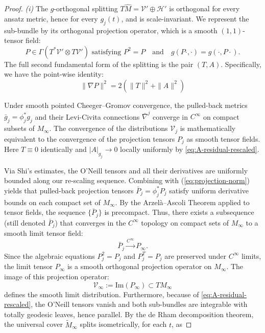 \documentclass[11pt]{amsart}
\theoremstyle{plain}
\numberwithin{equation}{section}
\theoremstyle{definition}
\theoremstyle{remark}
\begin{document}
\begin{proof}
\emph{(i)} The $g$-orthogonal splitting $T \widehat{M} = \mathcal{V}' \oplus \mathcal{H}'$ is orthogonal for every ansatz metric, hence for every $g_j (t)$, and is scale-invariant. We represent the sub-bundle by its orthogonal projection operator, which is a smooth $(1,1)$-tensor field:
\begin{equation*}
	P \in \Gamma(T^*\mathcal{V}' \otimes T\mathcal{V}')\text{ satisfying } P^2 = P \quad \text{and} \quad g(P \cdot, \cdot) = g(\cdot, P \cdot).
\end{equation*}
 The full second fundamental form of the splitting is the pair $( T, A )$. Specifically, we have the point-wise identity:
\begin{equation}
	\label{eq:projection-norm}
	\|\nabla P\|^2 = 2 \left( \|T\|^2 + \|A\|^2 \right)
\end{equation}

Under smooth pointed Cheeger–Gromov convergence, the pulled-back metrics $\bar{g}_j = \phi_j^* g_j$ and their Levi-Civita connections $\bar{\nabla}^j$ converge in $C^\infty$ on compact subsets of $M_\infty$. The convergence of the distributions $\mathcal{V}_j$ is mathematically equivalent to the convergence of the projection tensors $P_j$ as smooth tensor fields. Here $T \equiv 0$ identically and $| A |_{g_j} \to 0$ locally uniformly by \eqref{eq:A-residual-rescaled}. 


Via Shi's estimates, the O'Neill tensors and all their derivatives are uniformly bounded along our re-scaling sequence. Combining with (\ref{eq:projection-norm}) yields that pulled-back projection tensors $\bar{P}_j = \phi_j^* P_j$ satisfy uniform derivative bounds on each compact set of $M_\infty$. By the Arzelà–Ascoli Theorem applied to tensor fields, %
the sequence $\{\bar{P}_j\}$ is precompact. Thus, there exists a subsequence (still denoted $\bar{P}_j$) that converges in the $C^\infty$ topology on compact sets of $M_\infty$ to a smooth limit tensor field:
\begin{equation}
	\bar{P}_j \xrightarrow{C^\infty} P_\infty.
\end{equation}
Since the algebraic equations $P_j^2 = P_j$ and $P_j^T = P_j$ are preserved under $C^\infty$ limits, the limit tensor $P_\infty$ is a smooth orthogonal projection operator on $M_\infty$. The image of this projection operator:
\begin{equation}
	\mathcal{V}_\infty := \text{Im}(P_\infty) \subset TM_\infty
\end{equation}
defines the smooth limit distribution. Furthermore, because of \eqref{eq:A-residual-rescaled}, the O'Neill tensors vanish and both sub-bundles are integrable with totally geodesic leaves, hence parallel. By the de Rham decomposition theorem, the universal cover $\widetilde{M}_\infty$ splits isometrically, for each $t$, as


\end{proof}
\end{document}
